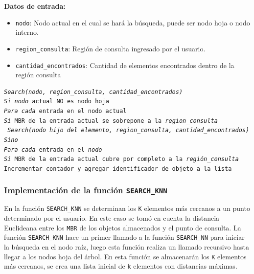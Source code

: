 \documentclass[a4paper]{article}
\newcommand\tab[1][0.5cm]{\hspace*{#1}}
\begin{document}
\textbf{Datos de entrada:}
\begin{itemize}
    \item \texttt{nodo}: Nodo actual en el cual se hará la búsqueda, puede ser nodo hoja o nodo interno.
    \item \texttt{region\_consulta}: Región de consulta ingresado por el usuario.
    \item \texttt{cantidad\_encontrados}: Cantidad de elementos encontrados dentro de la región consulta 
\end{itemize}

\texttt{\textit{Search(nodo, region\_consulta, cantidad\_encontrados)}}\\
\tab \texttt{\textit{Si } \textit{nodo} actual NO es nodo hoja }\\
\tab \tab \texttt{\textit{Para cada} entrada en el nodo actual}\\
\tab \tab\tab \texttt{\textit{Si } MBR de la entrada actual se sobrepone a la \textit{region\_consulta}}\\
\tab \tab\tab\tab \texttt{ \textit{Search(nodo hijo del elemento, region\_consulta, cantidad\_encontrados)}}\\
\tab \texttt{\textit{Sino}} \\
\tab \tab \texttt{\textit{Para cada} entrada en el \textit{nodo}}\\
\tab \tab\tab \texttt{\textit{Si } MBR de la entrada actual cubre por completo a la \textit{región\_consulta}}\\
\tab \tab\tab\tab \texttt{Incrementar contador y agregar identificador de objeto a la lista}\\

\subsubsection{Implementación de la función \texttt{SEARCH\_KNN}} %
En la función \texttt{SEARCH\_KNN} se determinan los \texttt{K} elementos más cercanos a un punto determinado por el usuario. En este caso se tomó en cuenta la distancia Euclideana entre los \texttt{MBR} de los objetos almacenados y el punto de consulta. La función  \texttt{SEARCH\_KNN} hace un primer llamado a la función  \texttt{SEARCH\_NN} para iniciar la búsqueda en el nodo raíz, luego esta función realiza un llamado recursivo hasta llegar a los nodos hoja del árbol. En esta función se almacenarán los \texttt{K} elementos más cercanos, se crea una lista inicial de \texttt{k} elementos con  distancias máximas. \cite{Kuan} \cite{Cheung} \\
\end{document}
